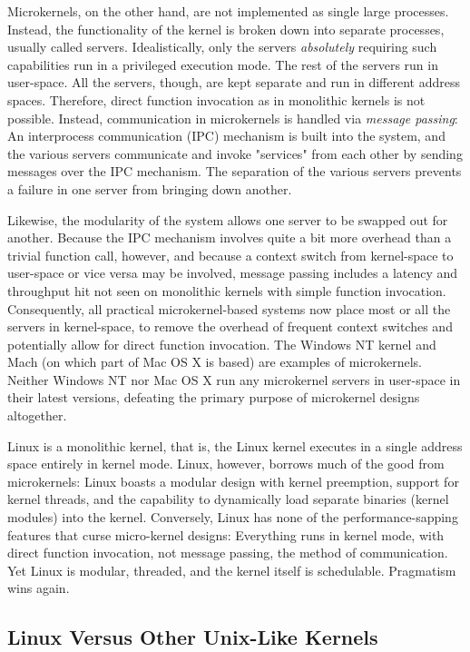 Microkernels, on the other hand, are not implemented as single large processes. Instead,
the functionality of the kernel is broken down into separate processes, usually called
servers. Idealistically, only the servers \emph{absolutely} requiring such capabilities
run in a privileged execution mode. The rest of the servers run in user-space. All the
servers, though, are kept separate and run in different address spaces. Therefore, direct
function invocation as in monolithic kernels is not possible. Instead, communication in
microkernels is handled via \emph{message passing}: An interprocess communication (IPC)
mechanism is built into the system, and the various servers communicate and invoke
"services" from each other by sending messages over the IPC mechanism. The separation of
the various servers prevents a failure in one server from bringing down another.

Likewise, the modularity of the system allows one server to be swapped out for
another. Because the IPC mechanism involves quite a bit more overhead than a trivial
function call, however, and because a context switch from kernel-space to user-space or
vice versa may be involved, message passing includes a latency and throughput hit not seen
on monolithic kernels with simple function invocation. Consequently, all practical
microkernel-based systems now place most or all the servers in kernel-space, to remove the
overhead of frequent context switches and potentially allow for direct function
invocation. The Windows NT kernel and Mach (on which part of Mac OS X is based) are
examples of microkernels. Neither Windows NT nor Mac OS X run any microkernel servers in
user-space in their latest versions, defeating the primary purpose of microkernel designs
altogether.

Linux is a monolithic kernel, that is, the Linux kernel executes in a single address space
entirely in kernel mode. Linux, however, borrows much of the good from microkernels: Linux
boasts a modular design with kernel preemption, support for kernel threads, and the
capability to dynamically load separate binaries (kernel modules) into the
kernel. Conversely, Linux has none of the performance-sapping features that curse
micro-kernel designs: Everything runs in kernel mode, with direct function invocation, not
message passing, the method of communication. Yet Linux is modular, threaded, and the
kernel itself is schedulable. Pragmatism wins again.

\subsection{Linux Versus Other Unix-Like Kernels}

